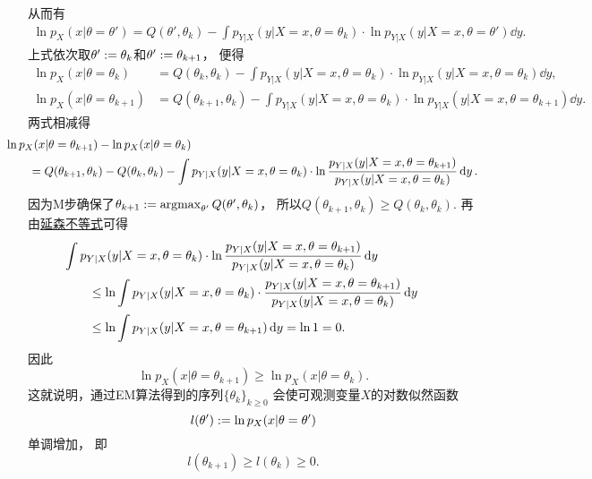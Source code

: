 从而有\begin{align*}
	\ln p_X(x \vert \theta=\theta')
	= Q(\theta',\theta_k)
	- \int p_{Y \vert X}(y \vert X=x, \theta=\theta_k) \cdot \ln p_{Y \vert X}(y \vert X=x, \theta=\theta') \dd{y}.
\end{align*}
上式依次取\(\theta' := \theta_k\)和\(\theta' := \theta_{k+1}\)，
便得\begin{align*}
	\ln p_X(x \vert \theta=\theta_k)
	&=  Q(\theta_k,\theta_k)
	- \int p_{Y \vert X}(y \vert X=x, \theta=\theta_k) \cdot \ln p_{Y \vert X}(y \vert X=x, \theta=\theta_k) \dd{y}, \\
	\ln p_X(x \vert \theta=\theta_{k+1})
	&=  Q(\theta_{k+1},\theta_k)
	- \int p_{Y \vert X}(y \vert X=x, \theta=\theta_k) \cdot \ln p_{Y \vert X}(y \vert X=x, \theta=\theta_{k+1}) \dd{y}.
\end{align*}
两式相减得\begin{align*}
	&\hspace{-20pt}
	\ln p_X(x \vert \theta=\theta_{k+1})
	- \ln p_X(x \vert \theta=\theta_k) \\
	&= Q(\theta_{k+1},\theta_k) - Q(\theta_k,\theta_k)
	- \int p_{Y \vert X}(y \vert X=x, \theta=\theta_k)
		\cdot \ln \frac{
			p_{Y \vert X}(y \vert X=x, \theta=\theta_{k+1})
		}{
			p_{Y \vert X}(y \vert X=x, \theta=\theta_k)
		}
		\dd{y}.
\end{align*}
因为M步确保了\(
	\theta_{k+1}
	:= \operatorname*{argmax}_{\theta'} Q(\theta',\theta_k)
\)，
所以\(
	Q(\theta_{k+1},\theta_k)
	\geq Q(\theta_k,\theta_k)
\).
再由\hyperref[theorem:随机变量的数字特征.延森不等式]{延森不等式}可得\begin{align*}
	&\hspace{-20pt}
	\int p_{Y \vert X}(y \vert X=x, \theta=\theta_k)
		\cdot \ln \frac{
			p_{Y \vert X}(y \vert X=x, \theta=\theta_{k+1})
		}{
			p_{Y \vert X}(y \vert X=x, \theta=\theta_k)
		}
		\dd{y} \\
	&\leq
	\ln \int p_{Y \vert X}(y \vert X=x, \theta=\theta_k)
		\cdot \frac{
			p_{Y \vert X}(y \vert X=x, \theta=\theta_{k+1})
		}{
			p_{Y \vert X}(y \vert X=x, \theta=\theta_k)
		}
		\dd{y} \\
	&\leq
	\ln \int p_{Y \vert X}(y \vert X=x, \theta=\theta_{k+1}) \dd{y}
	= \ln1
	= 0.
\end{align*}
因此\begin{equation*}
	\ln p_X(x \vert \theta=\theta_{k+1})
	\geq \ln p_X(x \vert \theta=\theta_k).
\end{equation*}
这就说明，通过EM算法得到的序列\(\{\theta_k\}_{k\geq0}\)
会使可观测变量\(X\)的对数似然函数\begin{equation*}
	l(\theta') := \ln p_X(x \vert \theta=\theta')
\end{equation*}
单调增加，
即\begin{equation*}
	l(\theta_{k+1})
	\geq l(\theta_k)
	\geq 0.
\end{equation*}


